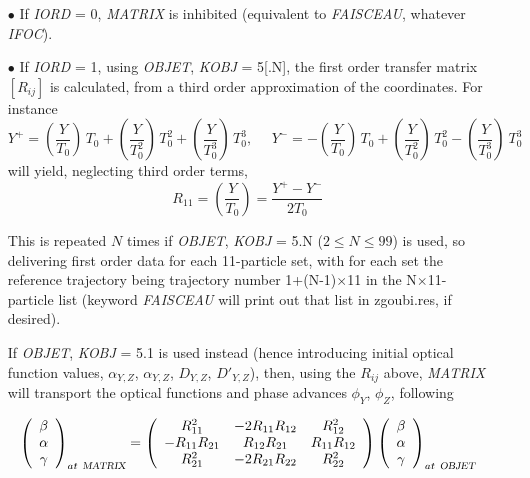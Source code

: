 {\begin{itemize}
\item[$\bullet$] If \textsl{IORD} = 0, \textsl{MATRIX}  is inhibited (equivalent to 
\textsl{FAISCEAU}, whatever \textsl{IFOC}). 

\item[$\bullet$] If \textsl{IORD} = 1, using \textsl{OBJET}, \textsl{KOBJ} = 5[.N], the first order transfer matrix 
$ [R_{ij}]$ is calculated, from a third order approximation of the coordinates. For instance 
$$  Y^+    =   \left( \dfrac{Y}{T_0} \right)\, T_0
	             + \left(\dfrac{Y }{ T^2_0} \right)\, T^2_0 
	             + \left(\dfrac{Y }{ T^3_0} \right)\, T^3_0,   ~ ~ ~ ~ ~ ~ 
	 Y^-    =    - \left(\dfrac{Y }{ T_0} \right)\, T_0 
	             + \left(\dfrac{Y }{ T^2_0} \right)\, T^2_0 -
	             \left(\dfrac{Y }{ T^3_0} \right)\ T^3_0 $$
\noindent will yield, neglecting third order terms, 
$$          R_{11} = \left(\dfrac{Y }{ T_0} \right) = \dfrac{Y^+-Y^- }{ 2T_0} $$

\smallskip 

This is repeated $N$ times if \textsl{OBJET}, \textsl{KOBJ} = 5.N ($2\leq N \leq 99$) is used, 
so delivering first order data for each 
11-particle set, with for each set the reference trajectory being trajectory number 1+(N-1)$\times$11 in the 
N$\times$11-particle list (keyword \textsl{FAISCEAU} will print out that list in zgoubi.res, if desired). 

\smallskip 

If \textsl{OBJET}, \textsl{KOBJ} = 5.1 is used instead (hence introducing initial optical function values, 
$\alpha_{Y,Z}$, $\alpha_{Y,Z}$, $D_{Y,Z}$, $D'_{Y,Z}$), 
then, using the $R_{ij}$ above,  \textsl{MATRIX} will transport  the  optical functions and phase advances 
$\phi_Y$, $\phi_Z$, following

\begin{equation}
\left(
\begin{array}{c}
\beta \\
\alpha \\
\gamma \\
\end{array}
\right)_{at~\textsl{MATRIX}}
=
\left(
\begin{array}{ccc}
R_{11}^2      &  -2R_{11}R_{12} &  R_{12}^2 \\
-R_{11}R_{21} &  R_{12}R_{21} &  R_{11}R_{12} \\
R_{21}^2      &  -2R_{21}R_{22} &  R_{22}^2 \\
\end{array}
\right)
\left(
\begin{array}{c}
\beta \\
\alpha \\
\gamma \\
\end{array}
\right)_{at~\textsl{OBJET}}       \nonumber
\end{equation}


\end{itemize}}
